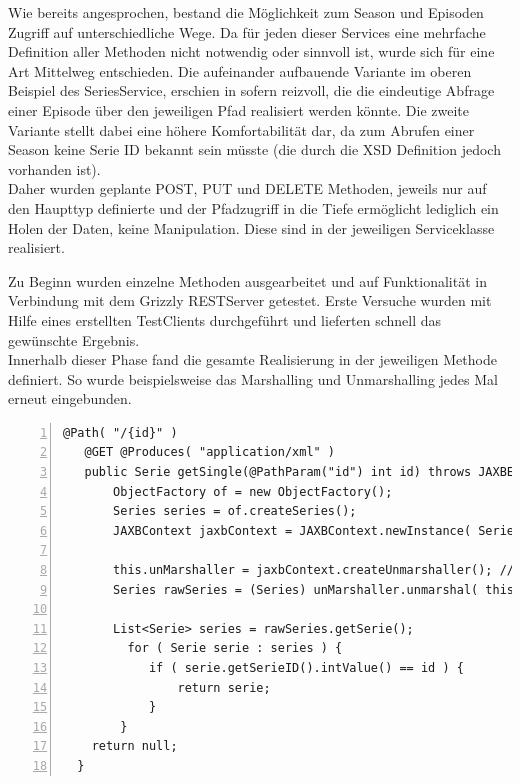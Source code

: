 Wie bereits angesprochen, bestand die Möglichkeit zum Season und Episoden Zugriff auf unterschiedliche Wege. Da für jeden dieser Services eine mehrfache Definition aller Methoden nicht notwendig oder sinnvoll ist, wurde sich für eine Art Mittelweg entschieden. Die aufeinander aufbauende Variante im oberen Beispiel des SeriesService, erschien in sofern reizvoll, die die eindeutige Abfrage einer Episode über den jeweiligen Pfad realisiert werden könnte. Die zweite Variante stellt dabei eine höhere Komfortabilität dar, da zum Abrufen einer Season keine Serie ID bekannt sein müsste (die durch die XSD Definition jedoch vorhanden ist).\\
Daher wurden geplante POST, PUT und DELETE Methoden, jeweils nur auf den Haupttyp definierte und der Pfadzugriff in die Tiefe ermöglicht lediglich ein Holen der Daten, keine Manipulation. Diese sind in der jeweiligen Serviceklasse realisiert.

\vspace{0.2cm}

Zu Beginn wurden einzelne Methoden ausgearbeitet und auf Funktionalität in Verbindung mit dem Grizzly RESTServer getestet. Erste Versuche wurden mit Hilfe eines erstellten TestClients durchgeführt und lieferten schnell das gewünschte Ergebnis.\\
Innerhalb dieser Phase fand  die gesamte Realisierung in der jeweiligen Methode definiert. So wurde beispielsweise das Marshalling und Unmarshalling jedes Mal erneut eingebunden.

\begin{lstlisting}[basicstyle=\ttfamily,numbers=left,numberstyle=\footnotesize\ttfamily,backgroundcolor=\color{source},label=seriesservice,caption= GET Testmethode der SeriesID]
   @Path( "/{id}" )
   @GET @Produces( "application/xml" )
   public Serie getSingle(@PathParam("id") int id) throws JAXBException {
       ObjectFactory of = new ObjectFactory();
       Series series = of.createSeries();
       JAXBContext jaxbContext = JAXBContext.newInstance( Series.class );

       this.unMarshaller = jaxbContext.createUnmarshaller(); // Reading
       Series rawSeries = (Series) unMarshaller.unmarshal( this.file );

       List<Serie> series = rawSeries.getSerie();
         for ( Serie serie : series ) {
            if ( serie.getSerieID().intValue() == id ) {
                return serie;
            }
        }
    return null;
  }
\end{lstlisting}

